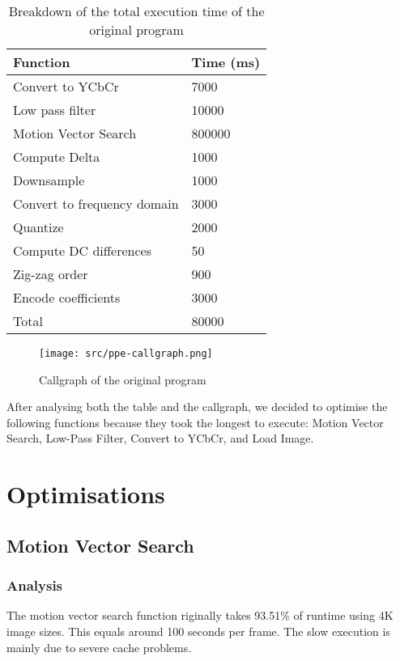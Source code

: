 \documentclass[a4paper]{article}
\begin{document}
\begin{table}[h]
  \centering
  \begin{tabular}{ll}
    \toprule
    Function & Time (ms) \\
    \midrule
    Convert to YCbCr & 7000 \\
    Low pass filter & 10000 \\
    Motion Vector Search & 800000 \\
    Compute Delta &                1000 \\
    Downsample &                   1000 \\
    Convert to frequency domain &  3000 \\
    Quantize &                     2000 \\
    Compute DC differences &       50 \\
    Zig-zag order &                900 \\
    Encode coefficients &          3000 \\
    \midrule
    Total & 80000 \\
    \bottomrule
  \end{tabular}
  \caption{Breakdown of the total execution time of the original
    program}
  \label{tab:vanilla_breakdown}
\end{table}

\begin{figure}[h]
  \centering \texttt{[image: src/ppe-callgraph.png]}
  \caption{Callgraph of the original program}
  \label{fig:vanilla_callgraph}
\end{figure}

After analysing both the table and the callgraph, we decided to
optimise the following functions because they took the longest to
execute: Motion Vector Search, Low-Pass Filter, Convert to YCbCr, and
Load Image.

\section{Optimisations}
\subsection{Motion Vector Search}
\subsubsection{Analysis}
The motion vector search function riginally takes 93.51\% of runtime using 4K image sizes. This equals
around 100 seconds per frame. The slow execution is mainly due to
severe cache problems.
\end{document}
